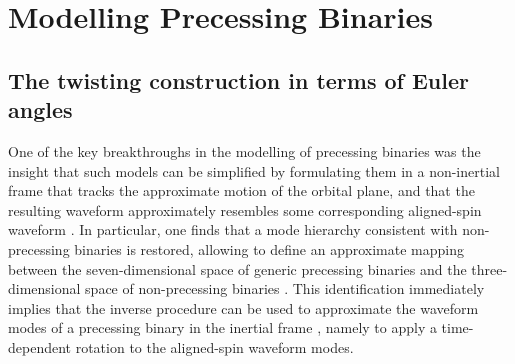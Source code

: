 \documentclass[%
aps,
prd,
amssymb,
amsmath,
amsfonts,
eqsecnum,
showpacs,
nofootinbib,
floatfix,
twocolumn,
twoside,
a4paper,
superscriptaddress
]{revtex4-1}
\newcommand{\nl}{\newline}
\newcommand{\phX}{\textsc{IMRPhenomXAS}\xspace}
\newcommand{\vth} {{\boldsymbol{{\theta}}}}
\begin{document}



\section{Modelling Precessing Binaries}
\label{sec:basics}

\subsection{The twisting construction in terms of Euler angles}
\label{sec:frames}


One of the key breakthroughs in the modelling of precessing binaries was the insight that such models can be simplified by formulating them in a non-inertial frame that tracks the approximate motion of the orbital plane, and that the resulting waveform approximately resembles some corresponding aligned-spin waveform \cite{Schmidt:2010it}. In particular, one finds that a mode hierarchy consistent with non-precessing binaries is restored, allowing to define an approximate mapping between the seven-dimensional space of generic precessing binaries and the three-dimensional space of non-precessing binaries \cite{Schmidt:2012rh}. This identification immediately implies that the inverse procedure can be used to approximate the waveform modes of a precessing binary in the inertial frame \cite{Schmidt:2012rh,Hannam:2013oca}, namely to apply a time-dependent rotation to the aligned-spin waveform modes.  
\end{document}
